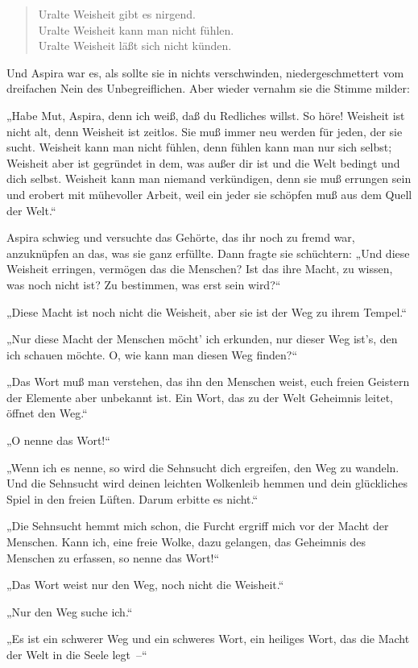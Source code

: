 \begin{verse}
Uralte Weisheit gibt es nirgend.\\ Uralte Weisheit kann man nicht
fühlen.\\ Uralte Weisheit läßt sich nicht künden.
\end{verse}
Und Aspira war es, als sollte sie in nichts verschwinden,
niedergeschmettert vom dreifachen Nein des Unbegreiflichen. Aber
wieder vernahm sie die Stimme milder:

„Habe Mut, Aspira, denn ich weiß, daß du Redliches willst. So höre!
Weisheit ist nicht alt, denn Weisheit ist zeitlos. Sie muß immer
neu werden für jeden, der sie sucht. Weisheit kann man nicht
fühlen, denn fühlen kann man nur sich selbst; Weisheit aber ist
gegründet in dem, was außer dir ist und die Welt bedingt und dich
selbst. Weisheit kann man niemand verkündigen, denn sie muß
errungen sein und erobert mit mühevoller Arbeit, weil ein jeder sie
schöpfen muß aus dem Quell der Welt.“

Aspira schwieg und versuchte das Gehörte, das ihr noch zu fremd
war, anzuknüpfen an das, was sie ganz erfüllte. Dann fragte sie
schüchtern: „Und diese Weisheit erringen, vermögen das die
Menschen? Ist das ihre Macht, zu wissen, was noch nicht ist? Zu
bestimmen, was erst sein wird?“

„Diese Macht ist noch nicht die Weisheit, aber sie ist der Weg zu
ihrem Tempel.“

„Nur diese Macht der Menschen möcht' ich erkunden, nur dieser Weg
ist's, den ich schauen möchte. O, wie kann man diesen Weg finden?“

„Das Wort muß man verstehen, das ihn den Menschen weist, euch
freien Geistern der Elemente aber unbekannt ist. Ein Wort, das zu
der Welt Geheimnis leitet, öffnet den Weg.“

„O nenne das Wort!“

„Wenn ich es nenne, so wird die Sehnsucht dich ergreifen, den Weg
zu wandeln. Und die Sehnsucht wird deinen leichten Wolkenleib
hemmen und dein glückliches Spiel in den freien Lüften. Darum
erbitte es nicht.“

„Die Sehnsucht hemmt mich schon, die Furcht ergriff mich vor der
Macht der Menschen. Kann ich, eine freie Wolke, dazu gelangen, das
Geheimnis des Menschen zu erfassen, so nenne das Wort!“

„Das Wort weist nur den Weg, noch nicht die Weisheit.“

„Nur den Weg suche ich.“

„Es ist ein schwerer Weg und ein schweres Wort, ein heiliges Wort,
das die Macht der Welt in die Seele legt~–“

